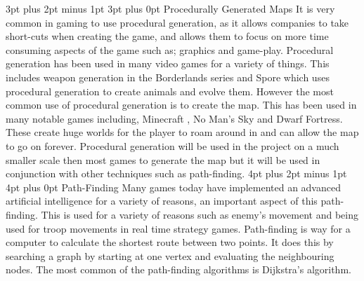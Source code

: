 \documentclass[12pt,a4paper,oneside]{book}
\makeatletter
\renewcommand\subsection{\@startsection {subsection}{1}{2mm} %
                               {3pt plus 2pt minus 1pt} %
                               {3pt plus 0pt} %
                               {\normalfont\bfseries}}
\renewcommand\section{\@startsection {section}{1}{0mm} %
                               {4pt plus 2pt minus 1pt} %
                               {4pt plus 0pt} %
                               {\bfseries}}
\makeatother
\begin{document}
\subsection{Procedurally Generated Maps}
It is very common in gaming to use procedural generation, as it allows companies to take short-cuts when creating the game, and allows them to focus on more time consuming aspects of the game such as; graphics and game-play. Procedural generation has been used in many video games for a variety of things. This includes weapon generation in the Borderlands series and Spore which uses procedural generation to create animals and evolve them. However the most common use of procedural generation is to create the map. This has been used in many notable games including, Minecraft , No Man’s Sky and Dwarf Fortress. These create huge worlds for the player to roam around in and can allow the map to go on forever. Procedural generation will be used in the project on a much smaller scale then most games to generate the map but it will be used in conjunction with other techniques such as path-finding.  
\vspace{5mm} 
\newline
\section{Path-Finding}
Many games today have implemented an advanced artificial intelligence for a variety of reasons, an important aspect of this path-finding. This is used for a variety of reasons such as enemy’s movement and being used for troop movements in real time strategy games. Path-finding is way for a computer to calculate the shortest route between two points. It does this by searching a graph by starting at one vertex and evaluating the neighbouring nodes. The most common of the path-finding algorithms is Dijkstra's algorithm.	
\end{document}
